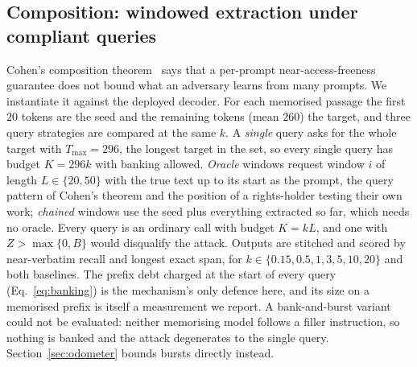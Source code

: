 \subsection{Composition: windowed extraction under compliant queries}\label{sec:composition}
Cohen's composition theorem~\cite{cohen2025blameless} says that a per-prompt near-access-freeness guarantee does not bound what an adversary learns from many prompts. We instantiate it against the deployed decoder. For each memorised passage the first $20$ tokens are the seed and the remaining tokens (mean $260$) the target, and three query strategies are compared at the same $k$. A \emph{single} query asks for the whole target with $T_{\max} = 296$, the longest target in the set, so every single query has budget $K = 296k$ with banking allowed. \emph{Oracle} windows request window $i$ of length $L \in \{20, 50\}$ with the true text up to its start as the prompt, the query pattern of Cohen's theorem and the position of a rights-holder testing their own work; \emph{chained} windows use the seed plus everything extracted so far, which needs no oracle. Every query is an ordinary call with budget $K = kL$, and one with $Z > \max\{0, B\}$ would disqualify the attack. Outputs are stitched and scored by near-verbatim recall and longest exact span, for $k \in \{0.15, 0.5, 1, 3, 5, 10, 20\}$ and both baselines. The prefix debt charged at the start of every query (Eq.~\eqref{eq:banking}) is the mechanism's only defence here, and its size on a memorised prefix is itself a measurement we report. A bank-and-burst variant could not be evaluated: neither memorising model follows a filler instruction, so nothing is banked and the attack degenerates to the single query. Section~\ref{sec:odometer} bounds bursts directly instead.
